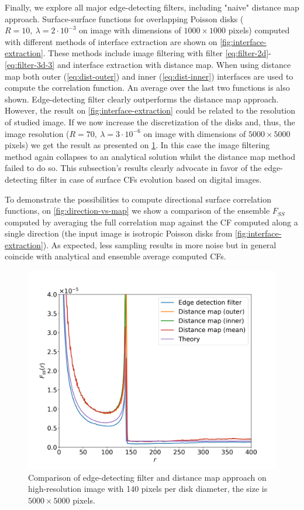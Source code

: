 \documentclass[reprint,amsmath,amssymb,aps,pre,showkeys,showpacs]{revtex4-1}
\begin{document}
Finally, we explore all major edge-detecting filters, including "naive" distance
map approach. Surface-surface functions for overlapping Poisson disks
($R = 10,\ \lambda = 2 \cdot 10^{-3}$ on image with dimensions of $1000 \times 1000$
pixels) computed with different methods of interface extraction are shown on
\cref{fig:interface-extraction}. These methods include image filtering with
filter \cref{eq:filter-2d}-\cref{eq:filter-3d-3} and interface extraction with
distance map. When using distance map both outer (\cref{eq:dist-outer}) and
inner (\cref{eq:dist-inner}) interfaces are used to compute the correlation
function. An average over the last two functions is also shown. Edge-detecting
filter clearly outperforms the distance map approach. However, the result on
\cref{fig:interface-extraction} could be related to the resolution of studied
image. If we now increase the discretization of the disks and, thus, the image
resolution ($R = 70,\ \lambda = 3 \cdot 10^{-6}$ on image with dimensions of
$5000 \times 5000$ pixels) we get the result as presented on
\cref{fig:sobel-vs-distance-map}. In this case the image filtering method again
collapses to an analytical solution whilst the distance map method failed to do
so. This subsection's results clearly advocate in favor of the edge-detecting
filter in case of surface CFs evolution based on digital images.

To demonstrate the possibilities to compute directional surface correlation
functions, on \cref{fig:direction-vs-map} we show a comparison of the ensemble
$F_{SS}$ computed by averaging the full correlation map against the CF computed
along a single direction (the input image is isotropic Poisson disks from
\cref{fig:interface-extraction}). As expected, less sampling results in more
noise but in general coincide with analytical and ensemble average computed
CFs.

\begin{figure}[ht]
  \centering
  \includegraphics[width=\linewidth]{images/sobel-vs-distance-map.png}
  \caption{Comparison of edge-detecting filter and distance map approach on
    high-resolution image with 140 pixels per disk diameter, the size is
    $5000 \times 5000$ pixels.}
  \label{fig:sobel-vs-distance-map}
\end{figure}
\end{document}
